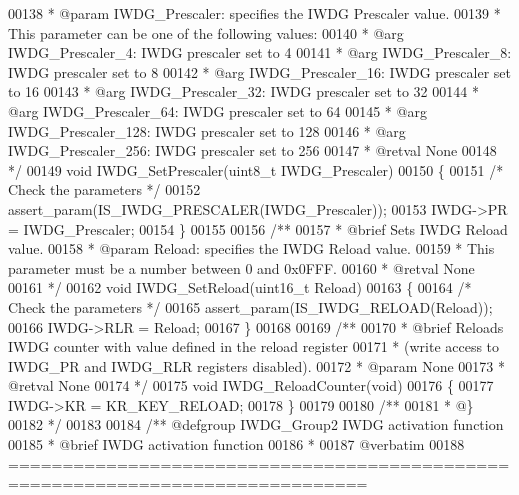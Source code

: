 \begin{DoxyCode}
00138 \textcolor{comment}{  * @param  IWDG\_Prescaler: specifies the IWDG Prescaler value.}
00139 \textcolor{comment}{  *          This parameter can be one of the following values:}
00140 \textcolor{comment}{  *            @arg IWDG\_Prescaler\_4: IWDG prescaler set to 4}
00141 \textcolor{comment}{  *            @arg IWDG\_Prescaler\_8: IWDG prescaler set to 8}
00142 \textcolor{comment}{  *            @arg IWDG\_Prescaler\_16: IWDG prescaler set to 16}
00143 \textcolor{comment}{  *            @arg IWDG\_Prescaler\_32: IWDG prescaler set to 32}
00144 \textcolor{comment}{  *            @arg IWDG\_Prescaler\_64: IWDG prescaler set to 64}
00145 \textcolor{comment}{  *            @arg IWDG\_Prescaler\_128: IWDG prescaler set to 128}
00146 \textcolor{comment}{  *            @arg IWDG\_Prescaler\_256: IWDG prescaler set to 256}
00147 \textcolor{comment}{  * @retval None}
00148 \textcolor{comment}{  */}
00149 \textcolor{keywordtype}{void} IWDG_SetPrescaler(uint8\_t IWDG\_Prescaler)
00150 \{
00151   \textcolor{comment}{/* Check the parameters */}
00152   assert_param(IS\_IWDG\_PRESCALER(IWDG\_Prescaler));
00153   IWDG->PR = IWDG\_Prescaler;
00154 \}
00155 
00156 \textcolor{comment}{/**}
00157 \textcolor{comment}{  * @brief  Sets IWDG Reload value.}
00158 \textcolor{comment}{  * @param  Reload: specifies the IWDG Reload value.}
00159 \textcolor{comment}{  *          This parameter must be a number between 0 and 0x0FFF.}
00160 \textcolor{comment}{  * @retval None}
00161 \textcolor{comment}{  */}
00162 \textcolor{keywordtype}{void} IWDG_SetReload(uint16\_t Reload)
00163 \{
00164   \textcolor{comment}{/* Check the parameters */}
00165   assert_param(IS\_IWDG\_RELOAD(Reload));
00166   IWDG->RLR = Reload;
00167 \}
00168 
00169 \textcolor{comment}{/**}
00170 \textcolor{comment}{  * @brief  Reloads IWDG counter with value defined in the reload register}
00171 \textcolor{comment}{  *         (write access to IWDG\_PR and IWDG\_RLR registers disabled).}
00172 \textcolor{comment}{  * @param  None}
00173 \textcolor{comment}{  * @retval None}
00174 \textcolor{comment}{  */}
00175 \textcolor{keywordtype}{void} IWDG_ReloadCounter(\textcolor{keywordtype}{void})
00176 \{
00177   IWDG->KR = KR_KEY_RELOAD;
00178 \}
00179 
00180 \textcolor{comment}{/**}
00181 \textcolor{comment}{  * @\}}
00182 \textcolor{comment}{  */}
00183 
00184 \textcolor{comment}{/** @defgroup IWDG\_Group2 IWDG activation function}
00185 \textcolor{comment}{ *  @brief   IWDG activation function }
00186 \textcolor{comment}{ *}
00187 \textcolor{comment}{@verbatim   }
00188 \textcolor{comment}{ ===============================================================================}

\end{DoxyCode}
